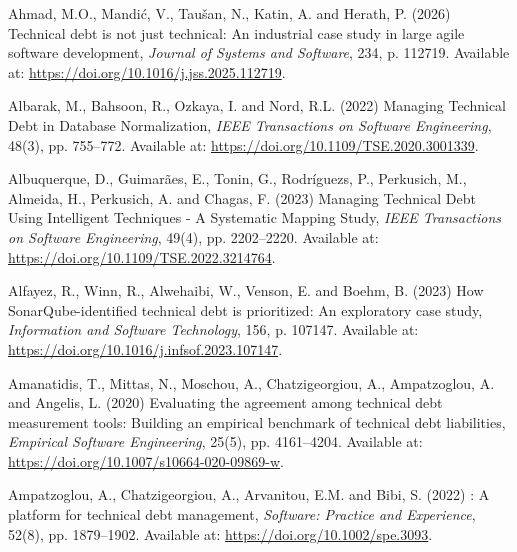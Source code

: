 \documentclass[
  12pt,
  letterpaper,
  12pt,
  oneside,
  english,
  onehalfspacing,
  headsepline]{MastersDoctoralThesis}
\newlength{\cslhangindent}
\newenvironment{CSLReferences}[2] %
 {\begin{list}{}{%
  \setlength{\itemindent}{0pt}
  \setlength{\leftmargin}{0pt}
  \setlength{\parsep}{0pt}
  \ifodd #1
   \setlength{\leftmargin}{\cslhangindent}
   \setlength{\itemindent}{-1\cslhangindent}
  \fi
  \setlength{\itemsep}{#2\baselineskip}}}
 {\end{list}}
\begin{document}
\label{refs}
\begin{CSLReferences}{0}{1}
Ahmad, M.O., Mandić, V., Taušan, N., Katin, A. and Herath, P. (2026)
\textquotesingle Technical debt is not just technical: {An} industrial
case study in large agile software development\textquotesingle,
\emph{Journal of Systems and Software}, 234, p. 112719. Available at:
\url{https://doi.org/10.1016/j.jss.2025.112719}.

Albarak, M., Bahsoon, R., Ozkaya, I. and Nord, R.L. (2022)
\textquotesingle Managing {Technical Debt} in {Database
Normalization}\textquotesingle, \emph{IEEE Transactions on Software
Engineering}, 48(3), pp. 755--772. Available at:
\url{https://doi.org/10.1109/TSE.2020.3001339}.

Albuquerque, D., Guimarães, E., Tonin, G., Rodríguezs, P., Perkusich,
M., Almeida, H., Perkusich, A. and Chagas, F. (2023)
\textquotesingle Managing {Technical Debt Using Intelligent Techniques}
- {A Systematic Mapping Study}\textquotesingle, \emph{IEEE Transactions
on Software Engineering}, 49(4), pp. 2202--2220. Available at:
\url{https://doi.org/10.1109/TSE.2022.3214764}.

Alfayez, R., Winn, R., Alwehaibi, W., Venson, E. and Boehm, B. (2023)
\textquotesingle How {SonarQube-identified} technical debt is
prioritized: {An} exploratory case study\textquotesingle,
\emph{Information and Software Technology}, 156, p. 107147. Available
at: \url{https://doi.org/10.1016/j.infsof.2023.107147}.

Amanatidis, T., Mittas, N., Moschou, A., Chatzigeorgiou, A.,
Ampatzoglou, A. and Angelis, L. (2020) \textquotesingle Evaluating the
agreement among technical debt measurement tools: Building an empirical
benchmark of technical debt liabilities\textquotesingle, \emph{Empirical
Software Engineering}, 25(5), pp. 4161--4204. Available at:
\url{https://doi.org/10.1007/s10664-020-09869-w}.

Ampatzoglou, A., Chatzigeorgiou, A., Arvanitou, E.M. and Bibi, S. (2022)
: {A} platform for technical debt
management\textquotesingle, \emph{Software: Practice and Experience},
52(8), pp. 1879--1902. Available at:
\url{https://doi.org/10.1002/spe.3093}.


\end{CSLReferences}
\end{document}
